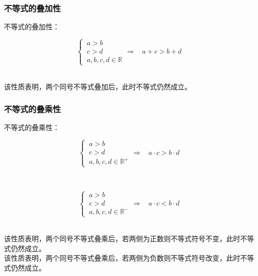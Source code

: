 \documentclass[UTF8]{ctexart}
\begin{document}
\subsubsection{不等式的叠加性}
    不等式的叠加性：\vspace{5pt}
    \begin{large}
        \begin{equation*}
            \begin{cases}
                ~a>b\\[3mm]
                ~c>d\\[3mm]
                ~a,b,c,d\in\mathbb{R}
            \end{cases}
            \Rightarrow~~~~a+c>b+d
        \end{equation*}
    \end{large}\\[1mm]
    该性质表明，两个同号不等式叠加后，此时不等式仍然成立。\\

\subsubsection{不等式的叠乘性}
    不等式的叠乘性：\vspace{5pt}
    \begin{large}
        \begin{equation*}
            \begin{cases}
                ~a>b\\[3mm]
                ~c>d\\[3mm]
                ~a,b,c,d\in\mathbb{R^+}
            \end{cases}
            \Rightarrow~~~~a\cdot c>b\cdot d
        \end{equation*}
    \end{large}\\
    \begin{large}
        \begin{equation*}
            \begin{cases}
                ~a>b\\[3mm]
                ~c>d\\[3mm]
                ~a,b,c,d\in\mathbb{R^-}
            \end{cases}
            \Rightarrow~~~~a\cdot c<b\cdot d
        \end{equation*}
    \end{large}\\[1mm]
    该性质表明，两个同号不等式叠乘后，若两侧为正数则不等式符号不变，此时不等式仍然成立。\\[3mm]
    该性质表明，两个同号不等式叠乘后，若两侧为负数则不等式符号改变，此时不等式仍然成立。
\end{document}
